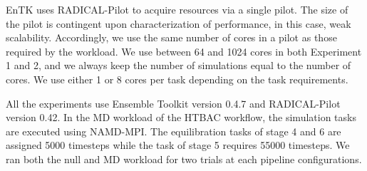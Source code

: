 
EnTK uses RADICAL-Pilot to acquire resources via a single pilot. The size of
the pilot is contingent upon characterization of performance, in this case,
weak scalability. Accordingly, we use the same number of cores in a pilot as
those required by the workload.%
We use between 64 and 1024 cores in both Experiment 1 and 2, and we always
keep the number of simulations equal to the number of cores. %
We use either 1 or 8 cores per task %
depending on the task requirements.




All the experiments use Ensemble Toolkit version 0.4.7 and RADICAL-Pilot
version 0.42. In the MD workload of the HTBAC workflow, the simulation tasks
are executed using NAMD-MPI\@. The equilibration %
tasks of stage 4 and 6 are assigned 5000 timesteps while the task of stage 5
requires 55000 timesteps. We ran both the null and MD workload for two trials
at each pipeline configurations.

